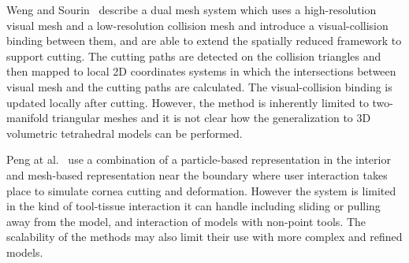 Weng and Sourin~\cite{weng:sym:2018} describe a dual mesh system which uses a high-resolution visual mesh and a low-resolution collision mesh and introduce a visual-collision binding between them, and are able to extend the spatially reduced framework to support cutting. The cutting paths are detected on the collision triangles and then mapped to local 2D coordinates systems in which the intersections between visual mesh and the cutting paths are calculated.  The visual-collision binding is updated locally after cutting. However, the method is inherently limited to two-manifold triangular meshes and it is not clear how the generalization to 3D volumetric tetrahedral models can be performed.

Peng at al.~\cite{peng:mta:2019} use a combination of a particle-based representation in the interior and mesh-based representation near the boundary where user interaction takes place to simulate cornea cutting and deformation. However the system is limited in the kind of tool-tissue interaction it can handle including sliding or pulling away from the model, and interaction of models with non-point tools. The scalability of the methods may also limit their use with more complex and refined models.
